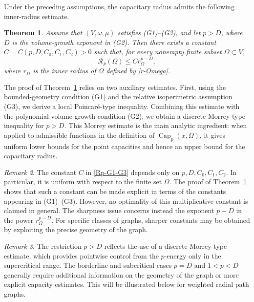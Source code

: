\documentclass[twoside,12pt,letter]{article}
\theoremstyle{plain}
\newtheorem{theorem}{Theorem}[section]
\theoremstyle{definition}
\theoremstyle{remark}
\newtheorem{remark}[theorem]{Remark}
\numberwithin{equation}{section}
\begin{document}
Under the preceding assumptions, the capacitary radius admits the following
inner-radius estimate.

\begin{theorem}\label{thm-cap-radius-inner}
Assume that \((V,\omega,\mu)\) satisfies {\rm(G1)}--{\rm(G3)}, and let
\(p>D\), where \(D\) is the volume-growth exponent in {\rm(G2)}. Then there
exists a constant \(C=C(p,D,C_0,C_1,C_2)>0\) such that, for every nonempty
finite subset \(\Omega\subset V\),
\begin{equation}\label{Rp-G1-G3}
\mathcal{R}_p(\Omega)\le C r_\Omega^{p-D},
\end{equation}
where \(r_\Omega\) is the inner radius of \(\Omega\) defined by \eqref{r-Omega}.
\end{theorem}

The proof of Theorem~\ref{thm-cap-radius-inner} relies on two auxiliary
estimates. First, using the bounded-geometry condition {\rm(G1)} and the
relative isoperimetric assumption {\rm(G3)}, we derive a local Poincar\'e-type
inequality. Combining this estimate with the polynomial volume-growth condition
{\rm(G2)}, we obtain a discrete Morrey-type inequality for \(p>D\). This Morrey
estimate is the main analytic ingredient: when applied to admissible functions
in the definition of \(\operatorname{Cap}_p(x,\Omega)\), it gives uniform lower
bounds for the point capacities and hence an upper bound for the capacitary
radius.

\begin{remark}
The constant \(C\) in \eqref{Rp-G1-G3} depends only on
\(p,D,C_0,C_1,C_2\). In particular, it is uniform with respect to the finite
set \(\Omega\). The proof of Theorem~\ref{thm-cap-radius-inner} shows that such
a constant can be made explicit in terms of the constants appearing in
{\rm(G1)}--{\rm(G3)}. However, no optimality of this multiplicative constant is
claimed in general. The sharpness issue concerns instead the exponent
\(p-D\) in the power \(r_\Omega^{p-D}\). For specific classes of graphs,
sharper constants may be obtained by exploiting the precise geometry of the
graph.
\end{remark}

\begin{remark}
The restriction \(p>D\) reflects the use of a discrete Morrey-type estimate,
which provides pointwise control from the \(p\)-energy only in the supercritical
range. The borderline and subcritical cases \(p=D\) and \(1<p<D\) generally
require additional information on the geometry of the graph or more explicit
capacity estimates. This will be illustrated below for weighted radial path
graphs.
\end{remark}
\end{document}
